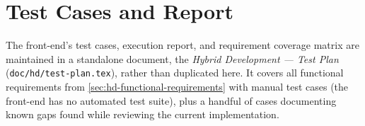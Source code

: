 \section{Test Cases and Report}\label{sec:hd-testing}

The front-end's test cases, execution report, and requirement coverage matrix are maintained in a standalone document, the \emph{Hybrid Development --- Test Plan} (\texttt{doc/hd/test-plan.tex}), rather than duplicated here. It covers all functional requirements from \cref{sec:hd-functional-requirements} with manual test cases (the front-end has no automated test suite), plus a handful of cases documenting known gaps found while reviewing the current implementation.

